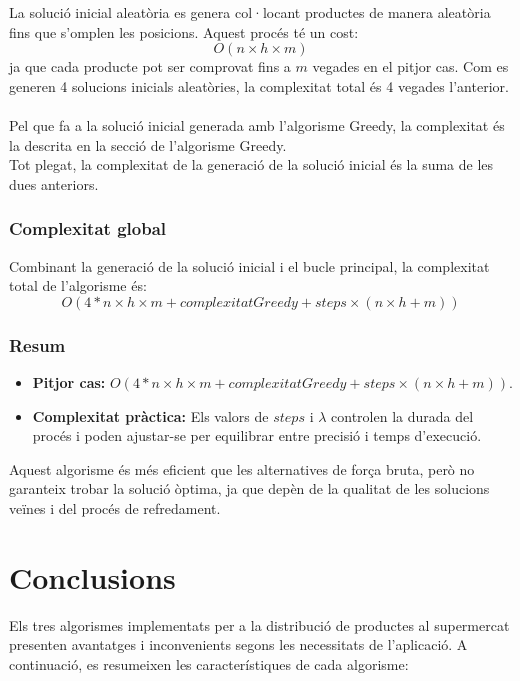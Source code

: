 \documentclass[a4paper,12pt]{report}
\begin{document}
La solució inicial aleatòria es genera col·locant productes de manera aleatòria fins que s'omplen les posicions. Aquest procés té un cost:
\[
O(n \times h \times m)
\]
ja que cada producte pot ser comprovat fins a \(m\) vegades en el pitjor cas. Com es generen 4 solucions inicials aleatòries, la complexitat total és 4 vegades l'anterior.\\
\\
Pel que fa a la solució inicial generada amb l'algorisme Greedy, la complexitat és la descrita en la secció de l'algorisme Greedy.\\ 
Tot plegat, la complexitat de la generació de la solució inicial és la suma de les dues anteriors.

\subsubsection{Complexitat global}

Combinant la generació de la solució inicial i el bucle principal, la complexitat total de l'algorisme és:
\[
O(4 * n \times h \times m + complexitatGreedy + steps \times (n \times h + m))
\]

\subsubsection{Resum}

\begin{itemize}
    \item \textbf{Pitjor cas:} \(O(4 * n \times h \times m + complexitatGreedy + steps \times (n \times h + m))\).
    \item \textbf{Complexitat pràctica:} Els valors de \(steps\) i \(\lambda\) controlen la durada del procés i poden ajustar-se per equilibrar entre precisió i temps d'execució.
\end{itemize}

Aquest algorisme és més eficient que les alternatives de força bruta, però no garanteix trobar la solució òptima, ja que depèn de la qualitat de les solucions veïnes i del procés de refredament.

\section{Conclusions}	

Els tres algorismes implementats per a la distribució de productes al supermercat presenten avantatges i inconvenients segons les necessitats de l'aplicació. A continuació, es resumeixen les característiques de cada algorisme:
\end{document}
